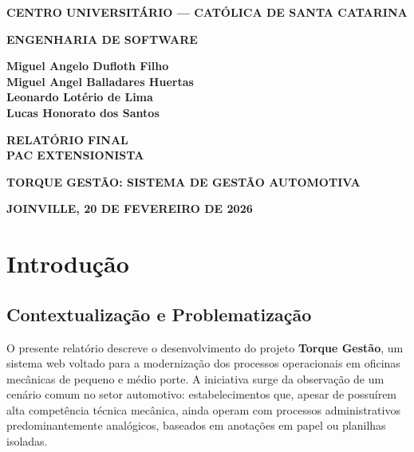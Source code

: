 \documentclass[12pt, a4paper]{article}
\begin{document}
\hypersetup{pageanchor=false}
\begin{titlepage}
  \centering
  \thispagestyle{empty}

  {\bfseries CENTRO UNIVERSITÁRIO --- CATÓLICA DE SANTA CATARINA}

  \vspace{6pt}
  {\bfseries ENGENHARIA DE SOFTWARE}

  \vspace{48pt}

  {\bfseries
    Miguel Angelo Dufloth Filho \\
    Miguel Angel Balladares Huertas \\
    Leonardo Lotério de Lima \\
    Lucas Honorato dos Santos
  }

  \vfill

  {\bfseries\large RELATÓRIO FINAL \\ PAC EXTENSIONISTA}

  \vspace{12pt}
  {\bfseries\Large TORQUE GESTÃO: SISTEMA DE GESTÃO AUTOMOTIVA}

  \vfill

  {\bfseries JOINVILLE, 20 DE FEVEREIRO DE 2026}
\end{titlepage}
\hypersetup{pageanchor=true}

\newpage
\tableofcontents

\newpage
\section{Introdução}

\subsection{Contextualização e Problematização}

O presente relatório descreve o desenvolvimento do projeto \textbf{Torque Gestão}, um sistema web voltado para a modernização dos processos operacionais em oficinas mecânicas de pequeno e médio porte. A iniciativa surge da observação de um cenário comum no setor automotivo: estabelecimentos que, apesar de possuírem alta competência técnica mecânica, ainda operam com processos administrativos predominantemente analógicos, baseados em anotações em papel ou planilhas isoladas.
\end{document}
